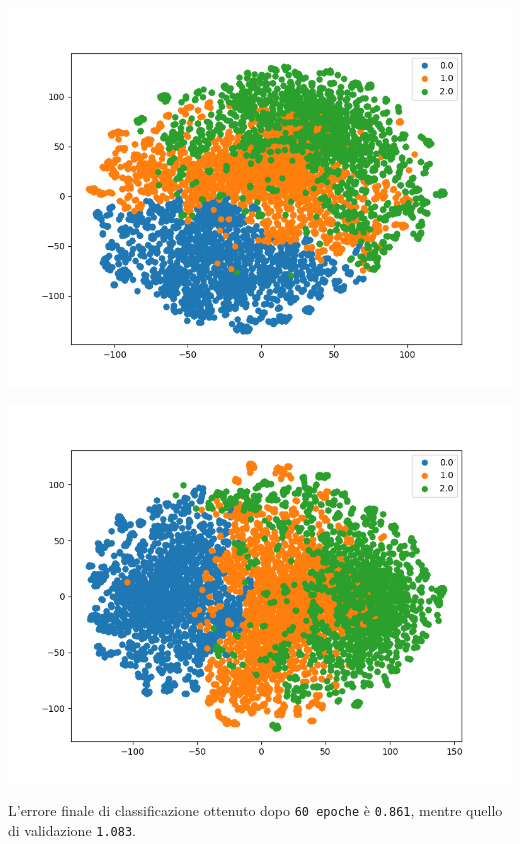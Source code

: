 \documentclass[11pt]{article}
\begin{document}
\begin{center}
\begin{minipage}{0.3\linewidth}
    \end{minipage}
    \begin{minipage}{0.3\linewidth}
    \includegraphics[width=\linewidth]{TML-TSNE-45.png}
    \end{minipage}
    \begin{minipage}{0.3\linewidth}
    \includegraphics[width=\linewidth]{TML-TSNE-60.png}
    \end{minipage}
\end{center}

L'errore finale di classificazione ottenuto dopo \texttt{60 epoche} è \texttt{0.861}, mentre quello di validazione \texttt{1.083}. 
\end{document}
